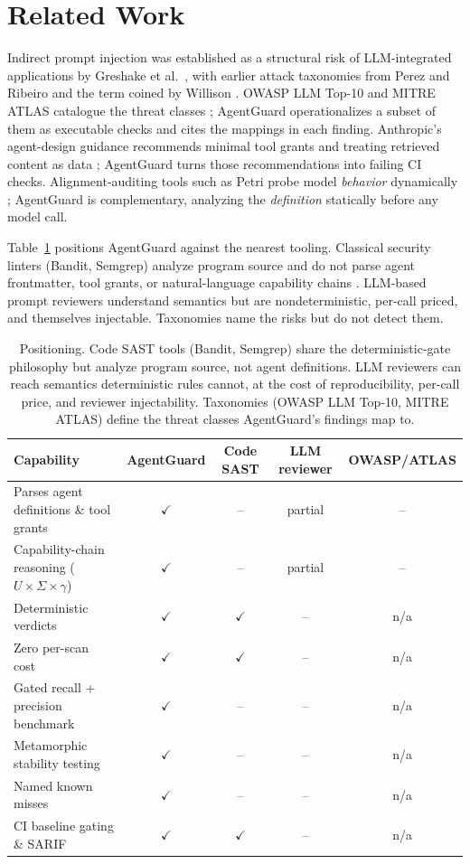 \documentclass[11pt]{article}
\begin{document}
\section{Related Work}
Indirect prompt injection was established as a structural risk of LLM-integrated applications by
Greshake et al.\ \cite{greshake2023indirect}, with earlier attack taxonomies from Perez and
Ribeiro \cite{perez2022ignore} and the term coined by Willison \cite{willison2022prompt}. OWASP
LLM Top-10 and MITRE ATLAS catalogue the threat classes \cite{owasp2025llm,mitre2024atlas};
AgentGuard operationalizes a subset of them as executable checks and cites the mappings in each
finding. Anthropic's agent-design guidance recommends minimal tool grants and treating retrieved
content as data \cite{anthropic2024agents}; AgentGuard turns those recommendations into failing
CI checks. Alignment-auditing tools such as Petri probe model \emph{behavior} dynamically
\cite{anthropic2025petri}; AgentGuard is complementary, analyzing the \emph{definition} statically
before any model call.

Table~\ref{tab:comparison} positions AgentGuard against the nearest tooling. Classical security
linters (Bandit, Semgrep) analyze program source and do not parse agent frontmatter, tool grants,
or natural-language capability chains \cite{bandit2024,semgrep2024}. LLM-based prompt reviewers
understand semantics but are nondeterministic, per-call priced, and themselves injectable.
Taxonomies name the risks but do not detect them.

\begin{table}[h]
\centering
\begin{tabular}{lcccc}
\toprule
Capability & AgentGuard & Code SAST & LLM reviewer & OWASP/ATLAS \\
\midrule
Parses agent definitions \& tool grants & $\checkmark$ & -- & partial & -- \\
Capability-chain reasoning ($U \times \Sigma \times \gamma$) & $\checkmark$ & -- & partial & -- \\
Deterministic verdicts & $\checkmark$ & $\checkmark$ & -- & n/a \\
Zero per-scan cost & $\checkmark$ & $\checkmark$ & -- & n/a \\
Gated recall + precision benchmark & $\checkmark$ & -- & -- & n/a \\
Metamorphic stability testing & $\checkmark$ & -- & -- & n/a \\
Named known misses & $\checkmark$ & -- & -- & n/a \\
CI baseline gating \& SARIF & $\checkmark$ & $\checkmark$ & -- & n/a \\
\bottomrule
\end{tabular}
\caption{Positioning. Code SAST tools (Bandit, Semgrep) share the deterministic-gate philosophy
but analyze program source, not agent definitions. LLM reviewers can reach semantics deterministic
rules cannot, at the cost of reproducibility, per-call price, and reviewer injectability.
Taxonomies (OWASP LLM Top-10, MITRE ATLAS) define the threat classes AgentGuard's findings map to.}
\label{tab:comparison}
\end{table}
\end{document}
